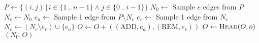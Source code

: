 \documentclass[a4paper,11pt]{article}
\begin{document}
	\begin{algorithmic}
			\State $P \gets \{(i, j) \,|\, i \in \{1 \,..\, n-1\} \wedge j \in \{0 \,..\, i-1\}\}$ 
			\State $N_0 \gets$ Sample $e$ edges from $P$
			\State $N_c \gets N_0$
				\State $e_a \gets $ Sample 1 edge from $P \setminus N_c$
				\State $e_r \gets $ Sample 1 edge from $N_c$
				\State $N_c \gets (N_c \setminus e_r) \cup \{e_a\}$
				\State $O \gets O + ((\textrm{ADD}, e_a), (\textrm{REM}, e_r))$
			\EndWhile
			\State $O \gets \Call{Head}{O, o}$ 
			\State \Return $(N_0, O)$ 
		\EndFunction
	\end{algorithmic}
	
\end{document}
